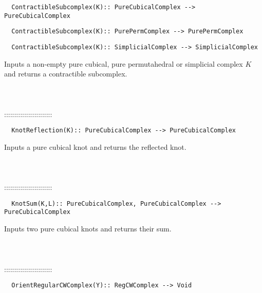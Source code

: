 \documentclass[a4paper,11pt]{report}
\begin{document}
{\begin{verbatim}  ContractibleSubcomplex(K):: PureCubicalComplex --> PureCubicalComplex
\end{verbatim}
 
\begin{verbatim}  ContractibleSubcomplex(K):: PurePermComplex --> PurePermComplex
\end{verbatim}
 
\begin{verbatim}  ContractibleSubcomplex(K):: SimplicialComplex --> SimplicialComplex
\end{verbatim}


 

 Inputs a non-empty pure cubical, pure permutahedral or simplicial complex $K$ and returns a contractible subcomplex. \\
 \\
 \\
 \\
 ::::::::::::::::::::::::\\
 
\begin{verbatim}  KnotReflection(K):: PureCubicalComplex --> PureCubicalComplex
\end{verbatim}


 

 Inputs a pure cubical knot and returns the reflected knot. \\
 \\
 \\
 \\
 ::::::::::::::::::::::::\\
 
\begin{verbatim}  KnotSum(K,L):: PureCubicalComplex, PureCubicalComplex --> PureCubicalComplex
\end{verbatim}


 

 Inputs two pure cubical knots and returns their sum. \\
 \\
 \\
 \\
 ::::::::::::::::::::::::\\
 
\begin{verbatim}  OrientRegularCWComplex(Y):: RegCWComplex --> Void
\end{verbatim}


}
\end{document}
